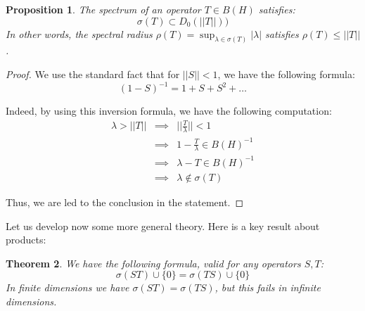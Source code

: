 \documentclass[12pt]{amsbook}
\newtheorem{theorem}{Theorem}[chapter]
\newtheorem{proposition}[theorem]{Proposition}
\begin{document}
\begin{proposition}
The spectrum of an operator $T\in B(H)$ satisfies:
$$\sigma(T)\subset D_0(||T||))$$
In other words, the spectral radius $\rho(T)=\sup_{\lambda\in\sigma(T)}|\lambda|$ satisfies $\rho(T)\leq||T||$. 
\end{proposition}

\begin{proof}
We use the standard fact that for $||S||<1$, we have the following formula:
$$(1-S)^{-1}=1+S+S^2+\ldots$$

Indeed, by using this inversion formula, we have the following computation:
\begin{eqnarray*}
\lambda>||T||
&\implies&\Big|\Big|\frac{T}{\lambda}\Big|\Big|<1\\
&\implies&1-\frac{T}{\lambda}\in B(H)^{-1}\\
&\implies&\lambda-T\in B(H)^{-1}\\
&\implies&\lambda\notin\sigma(T)
\end{eqnarray*}

Thus, we are led to the conclusion in the statement.
\end{proof}

Let us develop now some more general theory. Here is a key result about products:


\begin{theorem}
We have the following formula, valid for any operators $S,T$:
$$\sigma(ST)\cup\{0\}=\sigma(TS)\cup\{0\}$$
In finite dimensions we have $\sigma(ST)=\sigma(TS)$, but this fails in infinite dimensions.
\end{theorem}
\end{document}

